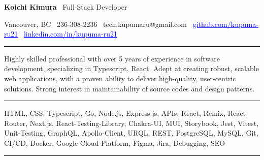 \documentclass{article}
\newcommand{\link}[2]{\href{#1}{\textcolor{blue}{\uline{#2}}}}
\begin{document}
\begin{center}
    {\LARGE \textbf{Koichi Kimura} \textbar\ \LARGE Full-Stack Developer}
\end{center}
\begin{center}
    Vancouver, BC \textbar\ 236-308-2236 \textbar\ tech.kupumaru@gmail.com \textbar\
    \link{https://github.com/kupuma-ru21}{github.com/kupuma-ru21} \textbar\
    \link{https://www.linkedin.com/in/kupuma-ru21}{linkedin.com/in/kupuma-ru21}
\end{center}

\par
\vspace{-1em}
\noindent\rule{\textwidth}{0.1pt}
\noindent
Highly skilled professional with over 5 years of experience in software development, specializing in Typescript, React. Adept at creating robust, scalable web applications, with a proven ability to deliver high-quality, user-centric solutions. Strong interest in maintainability of source codes and design patterns.

\vspace{1em}

\par
\vspace{-1em}
\noindent\rule{\textwidth}{0.1pt}

\noindent
HTML, CSS, Typescript, Go, Node.js, Express.js, APIs, React, Remix, React-Router, Next.js, React-Testing-Library, Chakra-UI, MUI, Storybook, Jest, Vitest, Unit-Testing, GraphQL, Apollo-Client, URQL, REST, PostgreSQL, MySQL, Git, CI/CD, Docker, Google Cloud Platform, Figma, Jira, Debugging, SEO
\noindent

\vspace{1em}

\par
\vspace{-1em}
\noindent\rule{\textwidth}{0.1pt}
\vspace{0.3em}
\end{document}
